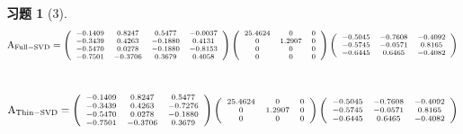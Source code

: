 \documentclass[12pt, oneside]{article}
\newtheorem*{exercise}{\textbf{习题}}
\begin{document}
  \begin{exercise}[3]
	\begin{equation*}
	  \scriptsize
	  \rm{
		A_{Full-SVD} = 
		\left( 
		\begin{array}{cccc}
		  -0.1409 & 0.8247 & 0.5477 & -0.0037 \\
		  -0.3439 & 0.4263 & -0.1880 & 0.4131 \\
		  -0.5470 & 0.0278 & -0.1880 & -0.8153 \\
		  -0.7501 & -0.3706 & 0.3679 & 0.4058 \\
		\end{array}
		\right)
		\left( 
		\begin{array}{ccc}
		  25.4624 & 0 & 0 \\
		  0 & 1.2907 & 0 \\
		  0 & 0 & 0 \\
		  0 & 0 & 0 \\
		\end{array}
		\right)
		\left( 
		\begin{array}{ccc}
		  -0.5045 & -0.7608 & -0.4092 \\
		  -0.5745 & -0.0571 & 0.8165 \\
		  -0.6445 & 0.6465 & -0.4082 \\
		\end{array}
		\right)
	  }
	\end{equation*} \\	
	\begin{equation*}
	  \scriptsize
	  \rm{
		A_{Thin-SVD} = 
		\left( 
		\begin{array}{ccc}
		  -0.1409 & 0.8247 & 0.5477 \\
		  -0.3439 & 0.4263 & -0.7276 \\
		  -0.5470 & 0.0278 & -0.1880 \\
		  -0.7501 & -0.3706 & 0.3679 \\
		\end{array}
		\right)
		\left( 
		\begin{array}{ccc}
		  25.4624 & 0 & 0 \\
		  0 & 1.2907 & 0 \\
		  0 & 0 & 0 \\
		\end{array}
		\right)
		\left( 
		\begin{array}{ccc}
		  -0.5045 & -0.7608 & -0.4092 \\
		  -0.5745 & -0.0571 & 0.8165 \\
		  -0.6445 & 0.6465 & -0.4082 \\
		\end{array}
		\right)
	  }
	\end{equation*}
  \end{exercise}
\end{document}
